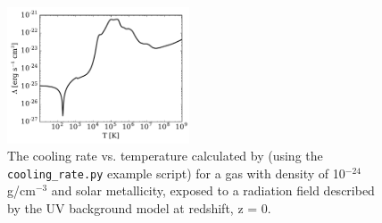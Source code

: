
\begin{figure}
\begin{center}
\includegraphics[width=0.48\textwidth]{figures/cooling_rate.pdf}
\caption{The cooling rate vs. temperature calculated by \grackle{}
  (using the \texttt{cooling\_rate.py} example script) for
  a gas with density of 10$^{-24}$ g/cm$^{-3}$ and solar metallicity,
  exposed to a radiation field described by the \citet{2012ApJ...746..125H} UV
  background model at redshift, z = 0.}
\label{fig:cooling-rate}
\end{center}
\vspace*{-1\baselineskip}
\end{figure}

